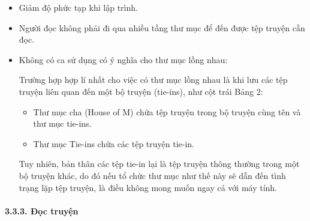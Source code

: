 \documentclass[
]{article}
\begin{document}
\begin{itemize}
\item
  Giảm độ phức tạp khi lập trình.
\item
  Người đọc không phải đi qua nhiều tầng thư mục để đến được tệp truyện
  cần đọc.
\item
  Không có ca sử dụng có ý nghĩa cho thư mục lồng nhau:

  Trường hợp hợp lí nhất cho việc có thư mục lồng nhau là khi lưu các
  tệp truyện liên quan đến một bộ truyện (tie-ins), như cột trái Bảng 2:

  \begin{itemize}
    \item
    Thư mục cha (House of M) chứa tệp truyện trong bộ truyện cùng tên và
    thư mục tie-ins.
  \item
    Thư mục Tie-ins chứa các tệp truyện tie-in.
  \end{itemize}

  Tuy nhiên, bản thân các tệp tie-in lại là tệp truyện thông thường
  trong một bộ truyện khác, do đó nếu tổ chức thư mục như thế này sẽ dẫn
  đến tình trạng lặp tệp truyện, là điều không mong muốn ngay cả với máy
  tính.
\end{itemize}

\hypertarget{ux111ux1ecdc-truyux1ec7n}{%
\paragraph{\texorpdfstring{3.3.3. Đọc truyện
}{3.3.3. Đọc truyện }}\label{ux111ux1ecdc-truyux1ec7n}}
\end{document}
